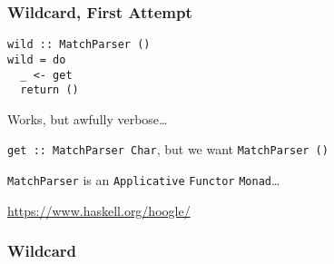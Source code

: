 \begin{frame}[fragile]

\frametitle{Wildcard, First Attempt}


\begin{lstlisting}
wild :: MatchParser ()
wild = do
  _ <- get
  return ()
\end{lstlisting}

\pause

\begin{center}

Works, but awfully verbose\ldots

\pause

\medskip

\lstinline|get :: MatchParser Char|, but we want \lstinline|MatchParser ()|

\pause

\medskip

\texttt{MatchParser} is an \texttt{Applicative} \texttt{Functor}
\texttt{Monad}\ldots

\pause

\medskip

\url{https://www.haskell.org/hoogle/}

\end{center}

\end{frame}


\begin{frame}

\frametitle{Wildcard}






\end{frame}
